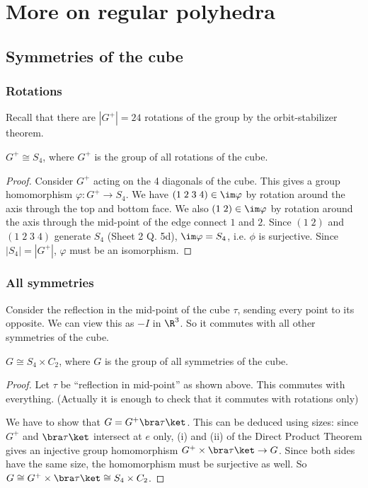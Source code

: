 \documentclass[a4pape]{article}
\begin{document}
\section{More on regular polyhedra}
\subsection{Symmetries of the cube}
\subsubsection{Rotations}
Recall that there are $|G^+| = 24$ rotations of the group by the orbit-stabilizer theorem.
\begin{prop}
  $G^+ \cong S_4$, where $G^+$ is the group of all rotations of the cube.
\end{prop}

\begin{proof}
Consider $G^+$ acting on the 4 diagonals of the cube. This gives a group homomorphism $\varphi: G^+ \to S_4$. We have $(1\; 2\; 3\; 4)\in\im \varphi$ by rotation around the axis through the top and bottom face. We also $(1\; 2)\in \im \varphi$ by rotation around the axis through the mid-point of the edge connect $1$ and $2$. Since $(1\; 2)$ and $(1\; 2\; 3\; 4)$ generate $S_4$ (Sheet 2 Q. 5d), $\im\varphi = S_4$, i.e. $\phi$ is surjective. Since $|S_4| = |G^+|$, $\varphi$ must be an isomorphism.
\end{proof}

\subsubsection{All symmetries}
Consider the reflection in the mid-point of the cube $\tau$, sending every point to its opposite. We can view this as $-I$ in $\R^3$. So it commutes with all other symmetries of the cube.
\begin{prop}
  $G \cong S_4\times C_2$, where $G$ is the group of all symmetries of the cube.
\end{prop}

\begin{proof}
  Let $\tau$ be ``reflection in mid-point'' as shown above. This commutes with everything. (Actually it is enough to check that it commutes with rotations only)

  We have to show that $G = G^+\bra \tau\ket$. This can be deduced using sizes: since $G^+$ and $\bra\tau\ket$ intersect at $e$ only, (i) and (ii) of the Direct Product Theorem gives an injective group homomorphism $G^+\times \bra\tau\ket \to G$. Since both sides have the same size, the homomorphism must be surjective as well. So $G\cong G^+\times \bra \tau\ket \cong S_4\times C_2$. 
\end{proof}
\end{document}

